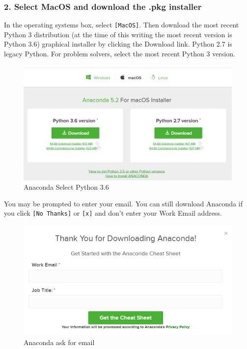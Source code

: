 \documentclass{book}
\makeatletter
\def\maxwidth{\ifdim\Gin@nat@width>\linewidth\linewidth
    \else\Gin@nat@width\fi}
\let\Oldincludegraphics\includegraphics
\renewcommand{\includegraphics}[1]{\Oldincludegraphics[width=.8\maxwidth]{#1}}
\makeatother
\begin{document}
    
        \subsubsection{2. Select MacOS and download the .pkg
installer}\label{select-macos-and-download-the-.pkg-installer}

In the operating systems box, select \lstinline![MacOS]!. Then download
the most recent Python 3 distribution (at the time of this writing the
most recent version is Python 3.6) graphical installer by clicking the
Download link. Python 2.7 is legacy Python. For problem solvers, select
the most recent Python 3 version.

\begin{figure}
\centering
\includegraphics{images/anaconda_download_mac.png}
\caption{Anaconda Select Python 3.6}
\end{figure}

You may be prompted to enter your email. You can still download Anaconda
if you click \lstinline![No Thanks]! or \lstinline![x]! and don't enter
your Work Email address.

\begin{figure}
\centering
\includegraphics{images/anaconda_download_mac_ask_for_email.png}
\caption{Anaconda ask for email}
\end{figure}
    
\end{document}

